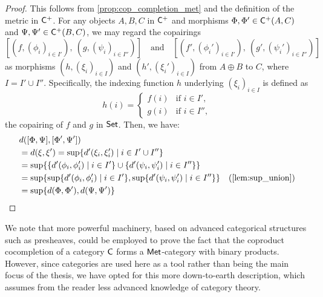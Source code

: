 \begin{proof}
  This follows from \autoref{prop:cop_completion_met} and the definition of the metric in $\mathsf{C}^+$. For any objects $A, B, C$ in $\mathsf{C}^+$ and morphisms $\Phi, \Phi' \in \mathsf{C}^+(A, C)$ and $\Psi, \Psi' \in \mathsf{C}^+(B, C)$, we may regard the copairings
\[
[(f,(\phi_i)_{i \in I'}),\ (g,(\psi_i)_{i \in I''})] \quad \text{and} \quad [(f',(\phi_i')_{i \in I'}),\ (g',(\psi_i')_{i \in I''})]
\]
as morphisms $(h,(\xi_i)_{i \in I})$ and $(h',(\xi_i')_{i \in I})$ from $A \oplus B$ to $C$, where $I = I' \cup I''$. Specifically, the indexing function $h$ underlying $(\xi_i)_{i \in I}$ is defined as
\[
h(i) =
\begin{cases}
f(i) & \text{if } i \in I', \\
g(i) & \text{if } i \in I'',
\end{cases}
\]
the copairing of $f$ and $g$ in $\mathsf{Set}$. Then, we have:
  \begin{align*}
    &d([\Phi, \Psi],[\Phi', \Psi'])  \\
    &= d ( \xi, \xi') = \sup\{d'(\xi_i, \xi'_i) \;\vert\; i \in I' \cup I'' \} \\
    & = \sup \{ \{d'(\phi_i, \phi'_i)\;\vert\; i \in I'\}  \cup \{d'(\psi_i, \psi'_i) \;\vert\; i \in I'' \} \} \\
    & = \sup \{ \sup  \{d'(\phi_i, \phi'_i)\;\vert\; i \in I'\}, \sup \{d'(\psi_i, \psi'_i) \;\vert\; i \in I'' \} \} & (\text{\autoref{lem:sup_union}}) \\
    & = \sup \{ d(\Phi,\Phi'), d(\Psi,\Psi') \}
  \end{align*}
\end{proof}

We note that more powerful machinery, based on advanced categorical structures such as presheaves, could be employed to prove the fact that the coproduct cocompletion of a category $\mathsf{C}$ forms a $\mathsf{Met}$-category with binary products. However, since categories are used here as a tool rather than being the main focus of the thesis, we have opted for this more down-to-earth description, which assumes from the reader less advanced knowledge of category theory.





